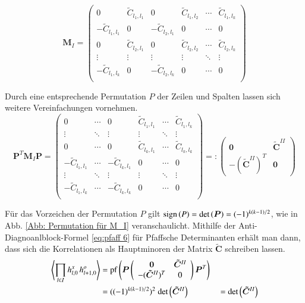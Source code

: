 \begin{equation}
\bm{M}_I 
    = \left(\begin{array}{ccccccc} 
      0 & \tilde{C}_{l_1,l_1} & 0 &\tilde{C}_{l_1,l_2} & \cdots & \tilde{C}_{l_1,l_k} \\
      - \tilde{C}_{l_1,l_1} & 0 & -\tilde{C}_{l_2,l_1} & 0 & \cdots & 0 \\
      0 & \tilde{C}_{l_2,l_1} & 0 & \tilde{C}_{l_2,l_2}  & \cdots & \tilde{C}_{l_2,l_k} \\
      \vdots & \vdots & \vdots & \vdots  & \ddots & \vdots \\
      - \tilde{C}_{l_1,l_k} & 0 & -\tilde{C}_{l_2,l_k}  & 0 & \cdots & 0 \\
      \end{array}\right)
\end{equation}

\noindent Durch eine entsprechende Permutation $P$ der Zeilen und Spalten lassen sich weitere Vereinfachungen vornehmen. 
\begin{equation}
    \bm{P}^T\bm{M}_I \bm{P} 
    = \left(\begin{array}{ccccccc} 
      0 & \cdots & 0 & \tilde{C}_{l_1,l_1} & \cdots & \tilde{C}_{l_1,l_k} \\
      \vdots & \ddots & \vdots & \vdots  & \ddots & \vdots \\
      0 & \cdots & 0 & \tilde{C}_{l_k,l_1} & \cdots & \tilde{C}_{l_k,l_k} \\
      -\tilde{C}_{l_1,l_1} & \cdots & -\tilde{C}_{l_k,l_1} & 0 & \cdots & 0   \\
      \vdots & \ddots & \vdots & \vdots  & \ddots & \vdots \\
      -\tilde{C}_{l_1,l_k} & \cdots & -\tilde{C}_{l_k,l_k} & 0 & \cdots & 0   \\
    \end{array}\right) 
    =: \left(\begin{array}{cc}
      \bm{0} & \bm{\tilde{C}}^{II} \\
      -(\bm{\tilde{C}}^{II})^T & \bm{0}
    \end{array}\right) 
\end{equation}

\noindent Für das Vorzeichen der Permutation $P$ gilt $\mathrm{sign}\left( P \right) = \mathrm{det}\left( \bm{P} \right) = (-1)^{k(k-1)/2}$, wie in Abb. \ref{Abb: Permutation für M_I} veranschaulicht. Mithilfe der Anti-Diagnoanlblock-Formel \eqref{eq:pfaff 6} für Pfaffsche Determinanten erhält man dann, dass sich die Korrelationen als Hauptminoren der Matrix $\bm{\tilde{C}}$ schreiben lassen.  
\begin{alignat}{2} 
\left\langle \prod_{l \in I} h_{l,0}^x\, h_{l+1,0}^o \right\rangle 
&= \mathrm{pf}\left( \bm{P} \left(\begin{array}{cc}
      \bm{0} & \bm{\tilde{C}}^{II} \\
      -(\bm{\tilde{C}}^{II})^T & 0
    \end{array}\right)  \bm{P}^T \right) && \nonumber\\
& = ((-1)^{k(k-1)/2})^2 \; \mathrm{det}\left( \bm{\tilde{C}}^{II} \right) &&= \mathrm{det}\left( \bm{\tilde{C}}^{II} \right) \label{eq: corr is minor of C}
\end{alignat}


